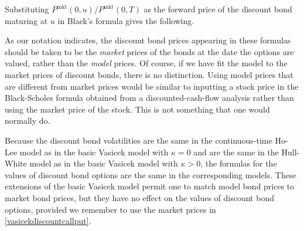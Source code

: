 Substituting $P^{\text{mkt}}(0,u)/P^{\text{mkt}}(0,T)$ as the forward price of the discount bond maturing at $u$ in Black's formula gives the following.

\noindent As our notation indicates, the discount bond prices  appearing in these formulas  should be taken to be the \emph{market} prices of the bonds at the date the options are valued, rather than the \emph{model} prices.  Of course, if we have fit the model to the market prices of discount bonds, there is no distinction.    Using model prices that are different from market prices would be similar to inputting a stock price in the Black-Scholes formula obtained from a discounted-cash-flow analysis rather than using the market price of the stock.  This is not something that one would normally do.  

Because the discount bond volatilities are the same in the continuous-time Ho-Lee model as in the basic Vasicek model with $\kappa=0$ and are the same in the Hull-White model as in the basic Vasicek model with $\kappa>0$, the formulas for the values of discount bond options are the same in the corresponding models.  These extensions of the basic Vasicek model permit one to match model bond prices to market bond prices, but they have no effect on the values of discount bond options, provided we remember to use the market prices in  \eqref{vasicekdiscountcallput}.


